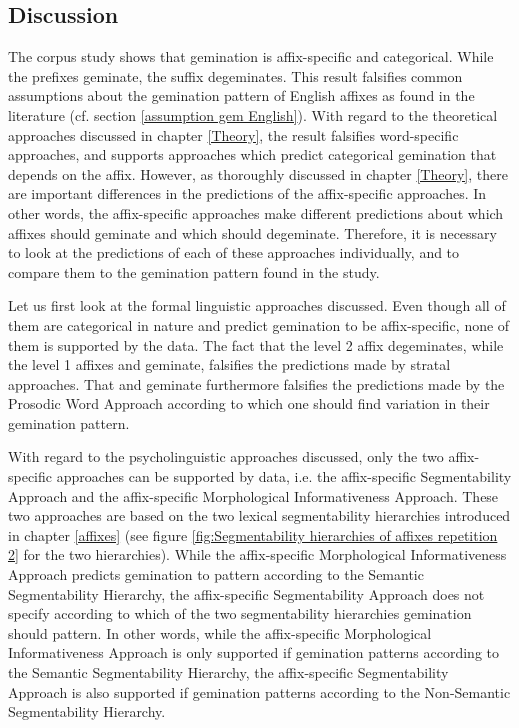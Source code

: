 \subsection{Discussion}


The corpus study shows that gemination is affix-specific and categorical. While the prefixes geminate, the suffix  degeminates. 
This result falsifies common assumptions about the gemination pattern of English affixes as found in the literature (cf. section \ref{assumption gem English}). 
With regard to the theoretical approaches discussed in chapter \ref{Theory}, the result falsifies word-specific approaches, and supports approaches which predict categorical gemination that depends on the affix. However, as thoroughly discussed in chapter \ref{Theory}, there are important differences in the predictions of the affix-specific approaches. In other words, the affix-specific approaches make different predictions about which affixes should geminate and which should degeminate. Therefore, it is necessary to look at the predictions of each of these approaches individually, and to compare them to the gemination pattern found in the study.

Let us first look at the formal linguistic approaches discussed. Even though all of them are categorical in nature and predict gemination to be affix-specific, none of them is supported by the data. The fact that the level 2 affix  degeminates, while the level 1 affixes  and  geminate, falsifies the predictions made by stratal approaches. That  and  geminate furthermore falsifies the predictions made by the Prosodic Word Approach according to which one should find variation in their gemination pattern. 

With regard to the psycholinguistic approaches discussed, only the two affix-specific approaches can be supported by data, i.e. the affix-specific Segmentability Approach and the affix-specific Morphological Informativeness Approach. 
These two approaches are based on the two lexical segmentability hierarchies introduced in chapter \ref{affixes} (see figure \ref{fig:Segmentability hierarchies of  affixes repetition 2} for the two hierarchies). While the affix-specific Morphological Informativeness Approach predicts gemination to pattern according to the Semantic Segmentability Hierarchy, the affix-specific Segmentability Approach does not specify according to which of the two segmentability hierarchies gemination should pattern. In other words, while the affix-specific Morphological Informativeness Approach is only supported if gemination patterns according to the Semantic Segmentability Hierarchy, the affix-specific Segmentability Approach is also supported if gemination patterns according to the Non-Semantic Segmentability Hierarchy. 


